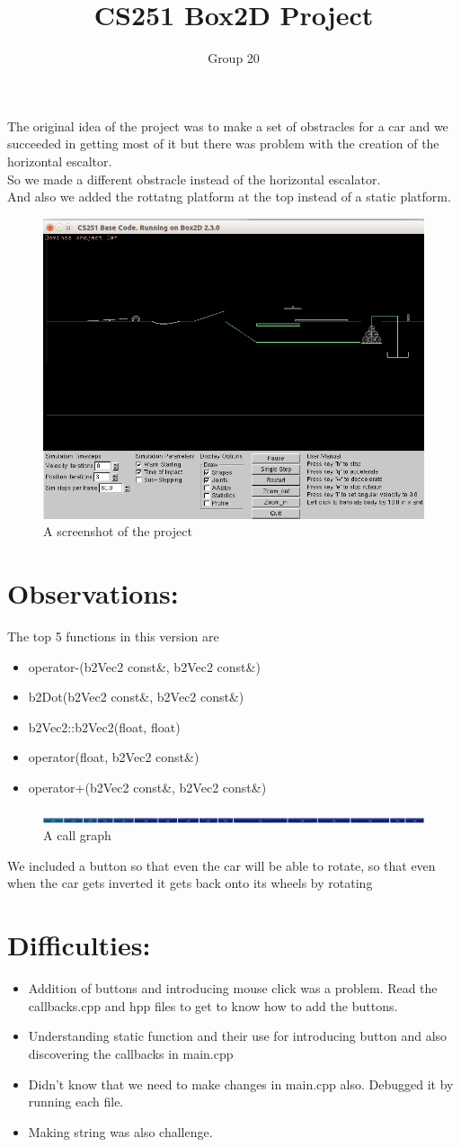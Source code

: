 \documentclass[a4paper,11pt]{article}
\begin{document}
\title{CS251 Box2D Project}
\author{Group 20}
\maketitle
The original idea of the project was to make a set of obstracles for a car and we succeeded in getting most of it but there was problem with the creation of the horizontal escaltor. \\ 
So we made a different obstracle instead of the horizontal escalator. \\ 
And also we added the rottatng platform at the top instead of a static platform. \\
\begin{figure}[h]
\centering\includegraphics[width=0.4\linewidth]{doc/example}
\caption{A screenshot of the project}
\end{figure}
\section{Observations:}
The top 5 functions in this version are
\begin{itemize}
 \item operator-(b2Vec2 const\&, b2Vec2 const\&)
 \item b2Dot(b2Vec2 const\&, b2Vec2 const\&)
 \item b2Vec2::b2Vec2(float, float)
 \item operator\*(float, b2Vec2 const\&)
 \item operator+(b2Vec2 const\&, b2Vec2 const\&)
\end{itemize}
\begin{figure}[h]
\centering\includegraphics[width=0.4\linewidth]{doc/profile}
\caption{A call graph}
\end{figure}
We included a button so that even the car will be able to rotate, so that even when the car gets inverted it gets back onto its wheels by rotating 
\section{Difficulties:}
\begin{itemize}
\item Addition of buttons and introducing mouse click was a problem. Read the callbacks.cpp and hpp files to get to know how to add the buttons.
\item Understanding static function and their use for introducing button and also discovering the callbacks in main.cpp
\item Didn't know that we need to make changes in main.cpp also. Debugged it by running each file.
\item Making string was also challenge.
\end{itemize}
\end{document}
